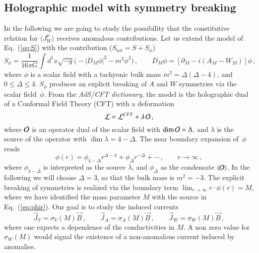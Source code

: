 \documentclass[epj]{webofc}
\begin{document}
\subsection{Holographic model with symmetry breaking}
\label{sec:sym_break}

In the following we are going to study the possibility that the constitutive relation for $\langle J_W^\mu \rangle$ receives anomalous contributions. Let us extend the model of Eq.~(\ref{eq:S}) with the contribution ($S_{\textrm{tot}} = S + S_\phi$)
\begin{equation}
 S_\phi = \frac{1}{16\pi G} \int d^5x \sqrt{-g} \bigg(  - |D_M \phi|^2 - m^2\phi^2  \bigg) \,, \qquad  D_M \phi = \left[ \partial_M -i(A_M - W_M) \right] \phi  \,, \label{eq:Sphi}
\end{equation}  
where $\phi$ is a scalar field with a tachyonic bulk mass $m^2 = \Delta (\Delta -4)$, and $0 \le \Delta \le 4$. $S_\phi$ produces an explicit breaking of $A$ and $W$ symmetries via the scalar field~$\phi$. From the {\it AdS/CFT dictionary}, the model is the holographic dual of a Conformal Field Theory (CFT) with a deformation
\begin{equation}
{\cal L} = {\cal L}^{CFT} + \lambda \, {\cal O} \,,
\end{equation}
where ${\cal O}$ is an operator dual of the scalar field with $\dim {\cal O} = \Delta$, and $\lambda$ is the source of the operator with $\dim \lambda = 4-\Delta$. The near boundary expansion of~$\phi$ reads
\begin{equation}
\phi(r) = \phi_{4-\Delta} r^{\Delta-4} + \phi_{\Delta} r^{-\Delta} + \cdots \,, \qquad r \to \infty \,, \label{eq:phir}
\end{equation}
where $\phi_{4-\Delta}$ is interpreted as the source $\lambda$, and $\phi_\Delta$ as the condensate $\langle {\cal O}\rangle$. In the following we will choose $\Delta = 3$, so that the bulk mass is $m^2 = -3$. The explicit breaking of symmetries is realized via the boundary term $\lim_{r\to\infty} r \cdot \phi(r) = M$, where we have identified the mass parameter $M$ with the source in Eq.~(\ref{eq:phir}). Our goal is to study the induced currents
\begin{equation}
\vec{J}_V = \sigma_V(M) \vec{B} \,,  \qquad \vec{J}_A = \sigma_A(M) \vec{B} \,, \qquad \vec{J}_W = \sigma_W(M) \vec{B} \,, \label{eq:currents}
\end{equation}
where one expects a dependence of the conductivities in $M$. A non zero value for $\sigma_W(M)$ would signal the existence of a non-anomalous current induced by anomalies.
\end{document}
